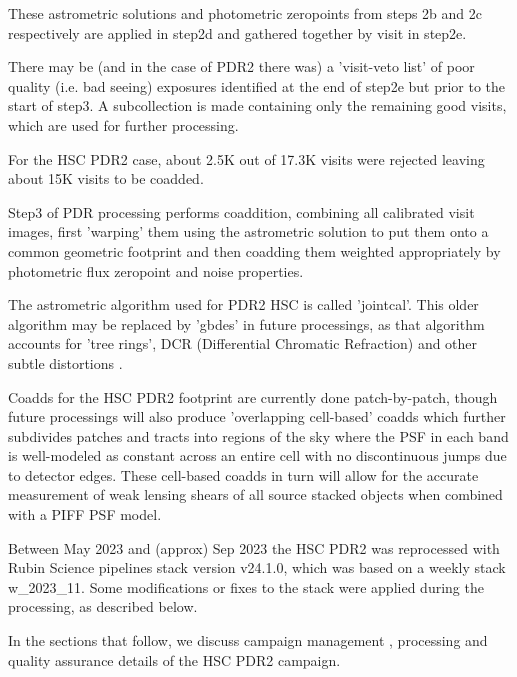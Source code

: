 These astrometric solutions and photometric zeropoints from steps 2b and 2c
respectively are applied in step2d and gathered together by visit in step2e.

There may be (and in the case of PDR2 there was) a 'visit-veto list' of 
poor quality (i.e. bad seeing) exposures identified at the end of step2e but 
prior to the start of step3.  A subcollection is made containing only 
the remaining good visits, which are used for further processing.  

For the HSC PDR2 case, about 2.5K out of 17.3K visits were rejected 
leaving about 15K visits to be coadded.

Step3 of PDR processing performs coaddition, combining all calibrated 
visit images, first 'warping' them using the astrometric solution to put 
them onto a common geometric footprint and then coadding them weighted 
appropriately by photometric flux zeropoint and noise properties.

The astrometric algorithm used for PDR2 HSC is called 'jointcal'.  This
older algorithm may be replaced by 'gbdes' in future processings, as that
algorithm accounts for 'tree rings', DCR 
(Differential Chromatic Refraction) and other subtle distortions .

Coadds for the HSC PDR2 footprint are currently done patch-by-patch,
though future processings will also produce 'overlapping cell-based' 
coadds  which further subdivides patches and tracts into regions of 
the sky where the PSF in each band is well-modeled as constant 
across an entire cell with no discontinuous jumps due to detector edges.
These cell-based coadds in turn will allow for the accurate measurement of 
weak lensing shears of all source stacked objects when combined with
a PIFF PSF model.

Between May 2023 and (approx) Sep 2023 the HSC PDR2 was reprocessed with 
Rubin Science pipelines stack version v24.1.0, which was 
based on a weekly stack w\_2023\_11.  Some modifications or fixes 
to the stack were applied during the processing, as described below.

In the sections that follow, we discuss campaign 
management , 
processing  and quality 
assurance  details of the HSC PDR2 campaign.


